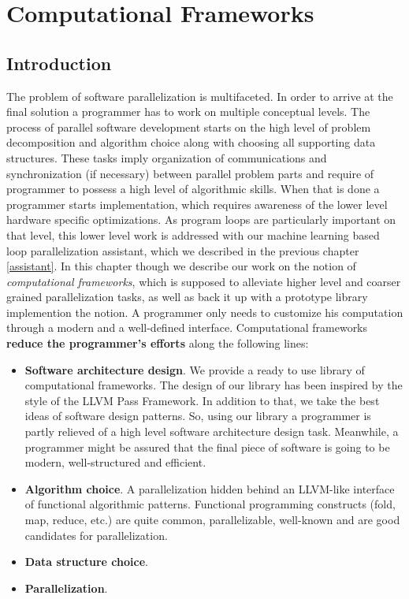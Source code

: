 \chapter{Computational Frameworks}
\label{frameworks}

\section{Introduction}
\label{frameworks_introduction}
\quad The problem of software parallelization is multifaceted. In order to arrive at the final solution a programmer has to work on multiple conceptual levels. The process of parallel software development starts on the high level of problem decomposition and algorithm choice along with choosing all supporting data structures. These tasks imply organization of communications and synchronization (if necessary) between parallel problem parts and require of programmer to possess a high level of algorithmic skills. When that is done a programmer starts implementation, which requires awareness of the lower level hardware specific optimizations. As program loops are particularly important on that level, this lower level work is addressed with our machine learning based loop parallelization assistant, which we described in the previous chapter \ref{assistant}. In this chapter though we describe our work on the notion of \textit{computational frameworks}, which is supposed to alleviate higher level and coarser grained parallelization tasks, as well as back it up with a prototype library implemention the notion. A programmer only needs to customize his computation through a modern and a well-defined interface.\newline\null
\quad Computational frameworks \textbf{reduce the programmer's efforts} along the following lines:
\begin{itemize}[style=unboxed,leftmargin=0cm]
\itemsep0em
\renewcommand\labelitemi{$\vartriangleright$}
\renewcommand\labelitemii{$\bullet$}
\item \textbf{Software architecture design}. We provide a ready to use library of computational frameworks. The design of our library has been inspired by the style of the LLVM Pass Framework. In addition to that, we take the best ideas of software design patterns. So, using our library a programmer is partly relieved of a high level software architecture design task. Meanwhile, a programmer might be assured that the final piece of software is going to be modern, well-structured and efficient.   
\item \textbf{Algorithm choice}. A parallelization hidden behind an LLVM-like interface of functional algorithmic patterns. Functional programming constructs (fold, map, reduce, etc.) are quite common, parallelizable, well-known and are good candidates for parallelization.
\item \textbf{Data structure choice}. \item \textbf{Parallelization}.
\end{itemize}
